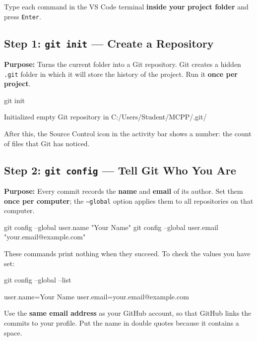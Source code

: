 \documentclass[11pt,a4paper]{article}
\newcommand{\code}[1]{\texttt{#1}}
\begin{document}
Type each command in the VS Code terminal \textbf{inside your project folder} and press \code{Enter}.

\subsection{Step 1: \code{git init} --- Create a Repository}

\textbf{Purpose:} Turns the current folder into a Git repository. Git creates a hidden \code{.git} folder in which it will store the history of the project. Run it \textbf{once per project}.

\begin{cmd}
git init
\end{cmd}
\begin{outbox}
Initialized empty Git repository in C:/Users/Student/MCPP/.git/
\end{outbox}

After this, the Source Control icon in the activity bar shows a number: the count of files that Git has noticed.

\subsection{Step 2: \code{git config} --- Tell Git Who You Are}

\textbf{Purpose:} Every commit records the \textbf{name} and \textbf{email} of its author. Set them \textbf{once per computer}; the \code{--global} option applies them to all repositories on that computer.

\begin{cmd}
git config --global user.name "Your Name"
git config --global user.email "your.email@example.com"
\end{cmd}

These commands print nothing when they succeed. To check the values you have set:

\begin{cmd}
git config --global --list
\end{cmd}
\begin{outbox}
user.name=Your Name
user.email=your.email@example.com
\end{outbox}

\begin{notebox}
Use the \textbf{same email address} as your GitHub account, so that GitHub links the commits to your profile. Put the name in double quotes because it contains a space.
\end{notebox}
\end{document}
